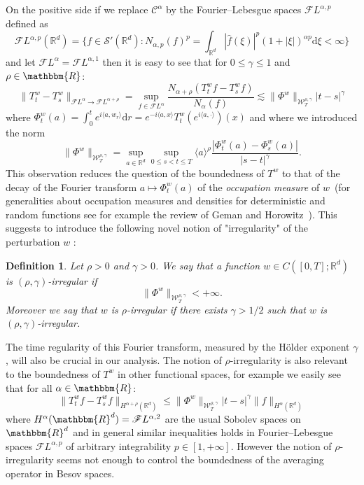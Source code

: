 \documentclass[a4paper,11pt]{article}
\newcommand{\mathd}{\mathrm{d}}
\newcommand{\tmem}[1]{{\em #1\/}}
\newtheorem{definition}[theorem]{Definition}
\newcommand{\CC}{\mathscr C}
\newcommand{\CF}{\mathscr F}
\newcommand{\RR}{\mathbb R}
\begin{document}
On the positive side if we replace $\CC^{\alpha}$ by the Fourier--Lebesgue
spaces $\mathcal{F}L^{\alpha ,p}$ defined as
\[ \mathcal{F}L^{\alpha ,p} ( \RR^{d} ) = \{f \in \mathcal{S}' ( \RR^{d}
   ):N_{\alpha ,p} (f)^{p} = \int_{\RR^{d}} | \hat{f} ( \xi )|^{p} (1+| \xi
   |)^{\alpha p} \mathd \xi < \infty\} \]
and let $\mathcal{F}L^{\alpha} =\mathcal{F}L^{\alpha ,1}$ then it is easy to
see that for $0 \leqslant \gamma \leqslant 1$ and $\rho \in \mathbbm{R}$:
\[ \| T^{w}_{t} -T^{w}_{s} \|_{\mathcal{F}L^{\alpha} \rightarrow
   \mathcal{F}L^{\alpha + \rho}} = \sup_{f \in \mathcal{F}L^{\alpha}}
   \frac{N_{\alpha + \rho} ( T^{w}_{t} f-T^{w}_{s} f )}{N_{\alpha} ( f )}
   \lesssim \| \Phi^{w} \|_{\mathcal{W}^{\rho , \gamma}_{T}} | t-s |^{\gamma}
\]
where $\Phi^{w}_{t} (a) = \int_{0}^{t} e^{i \langle a,w_{r} \rangle} \mathd
r=e^{-i \langle a,x \rangle} T^{w}_{t} (e^{i \langle a, \cdot \rangle} ) ( x
)$ and where we introduced the norm
\[ \| \Phi^{w} \|_{\mathcal{W}^{\rho , \gamma}_{T}} = \sup_{a \in \RR^{d}}  
   \sup_{0 \leqslant s<t \leqslant T} \langle a \rangle^{\rho} \frac{|
   \Phi^{w}_{t} (a)- \Phi^{w}_{s} (a) |}{|s-t|^{\gamma}} . \]
This observation reduces the question of the boundedness of $T^{w}$ to that of
the decay of the Fourier transform $a \mapsto \Phi^{w}_{t} (a)$ of the
{\tmem{occupation measure}} of $w$~(for generalities about occupation measures
and densities for deterministic and random functions see for example the
review of Geman and Horowitz~{\cite{geman_occupation_1980}}). This suggests to
introduce the following novel notion of "irregularity" of the perturbation $w$
:

\begin{definition}
  \label{def:irregularity}Let $\rho >0$ and $\gamma >0$. We say that a
  function $w \in C ([0,T]; \RR^{d} )$ is $( \rho , \gamma )$-irregular if
  \[ \| \Phi^{w} \|_{\mathcal{W}^{\rho , \gamma}_{T}} <+ \infty . \]
  Moreover we say that $w$ is $\rho$-irregular if there exists $\gamma >1/2$
  such that $w$ is $( \rho , \gamma )$-irregular.
\end{definition}

The time regularity of this Fourier transform, measured by the H\"older
exponent $\gamma$, will also be crucial in our analysis. The notion of
$\rho$-irregularity is also relevant to the boundedness of $T^{w}$ in other
functional spaces, for example we easily see that for all $\alpha \in
\mathbbm{R}$:
\[ \|T^{w}_{t} f-T^{w}_{s} f\|_{H^{\alpha + \rho} ( \RR^{d} )} \leqslant \|
   \Phi^{w} \|_{\mathcal{W}^{\rho , \gamma}_{T}} |t-s|^{\gamma}
   \|f\|_{H^{\alpha} ( \RR^{d} )} \]
where $H^{\alpha} ( \mathbbm{R}^{d} ) = \CF L^{\alpha ,2}$ are the usual
Sobolev spaces on $\mathbbm{R}^{d}$ and in general similar inequalities holds
in Fourier--Lebesgue spaces $\CF L^{\alpha ,p}$ of arbitrary integrability $p
\in [ 1,+ \infty ]$. However the notion of $\rho$-irregularity seems not
enough to control the boundedness of the averaging operator in Besov spaces.
\end{document}
